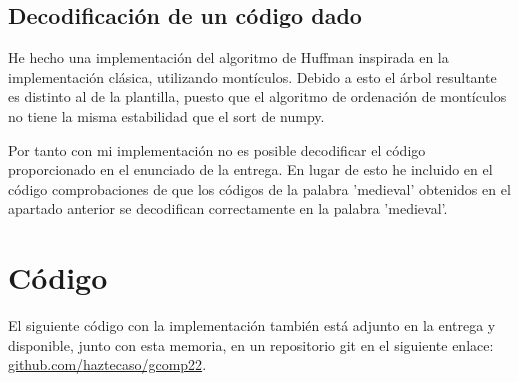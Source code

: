 \documentclass[10pt, spanish]{article}
\theoremstyle{definition}
\theoremstyle{break}
\begin{document}
\subsection{Decodificación de un código dado}

He hecho una implementación del algoritmo de Huffman inspirada en la
implementación clásica, utilizando montículos. Debido a esto el árbol resultante
es distinto al de la plantilla, puesto que el algoritmo de ordenación de
montículos no tiene la misma estabilidad que el sort de numpy.

Por tanto con mi implementación no es posible decodificar el código
proporcionado en el enunciado de la entrega. En lugar de esto he incluido en el
código comprobaciones de que los códigos de la palabra 'medieval' obtenidos en
el apartado anterior se decodifican correctamente en la palabra 'medieval'.

\section{Código}

El siguiente código con la implementación también está adjunto en la entrega
y disponible, junto con esta memoria, en un repositorio git en el siguiente
enlace:
\href{https://www.github.com/haztecaso/gcomp22}{github.com/haztecaso/gcomp22}.
\vspace{1em}


\end{document}
